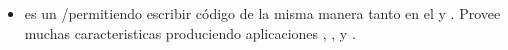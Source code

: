 \begin{itemize}
		\item
			\textbf{\danfNAME} es un \fullstackAS \javaScriptNAME/\nodejsNAME \oopPL \frameworkPC permitiendo escribir código de la misma manera tanto en el \serverSideAS y \clientSideAS. Provee muchas caracteristicas produciendo aplicaciones \scalableQA, \maintainableQA, \testeableQA y \performanceQA\cite{online_danf_official_gitHub}.

	\end{itemize}
